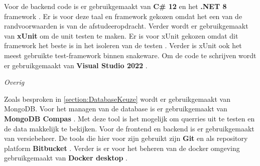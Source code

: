 \whitespace[2]
Voor de backend code is er gebruikgemaakt van \textbf{C\# 12} \parencite{CSharp} en het \textbf{.NET 8} framework \parencite{DotNet8}.
Er is voor deze taal en framework gekozen omdat het een van de randvoorwaarden is van de afstudeeropdracht.
Verder wordt er gebruikgemaakt van \textbf{xUnit} \parencite{xUnit} om de unit testen te maken.
Er is voor xUnit gekozen omdat dit framework het beste is in het isoleren van de testen \parencite{IsolationTest}. 
Verder is xUnit ook het meest gebruikte test-framework binnen snakeware.
Om de code te schrijven wordt er gebruikgemaakt van \textbf{Visual Studio 2022} \parencite{VisualStudio}.

\whitespace[2]
\textit{Overig}

\whitespace[2]
Zoals besproken in \ref{section:DatabaseKeuze} wordt er gebruikgemaakt van MongoDB.
Voor het managen van de database is er gebruikgemaakt van \textbf{MongoDB Compas} \parencite{MongoDBCompas}.
Met deze tool is het mogelijk om querries uit te testen en de data makkelijk te bekijken.
Voor de frontend en backend is er gebruikgemaakt van versiebeheer.
De tools die hier voor zijn gebruikt zijn \textbf{Git} \parencite{Git} en als repository platform \textbf{Bitbucket} \parencite{BitBucket}.
Verder is er voor het beheren van de docker omgeving gebruikgemaakt van \textbf{Docker desktop} \Parencite{DockerDesktop}.

